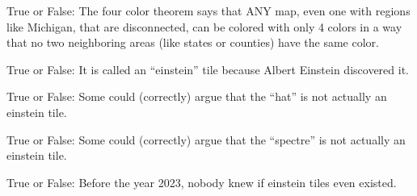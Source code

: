 \documentclass[nooutcomes,noauthor]{ximera}
\author{Bart Snapp}
\begin{document}
\maketitle


\begin{exercise}
  True or False: The four color theorem says that ANY map, even one
  with regions like Michigan, that are disconnected, can be colored
  with only 4 colors in a way that no two neighboring areas (like
  states or counties) have the same color.
\end{exercise}



\begin{exercise}
  True or False: It is called an ``einstein'' tile because Albert
  Einstein discovered it.
\end{exercise}



\begin{exercise}
  True or False: Some could (correctly) argue that the ``hat'' is not
  actually an einstein tile.
\end{exercise}



\begin{exercise}  
  True or False: Some could (correctly) argue that the ``spectre'' is
  not actually an einstein tile.
\end{exercise}


\begin{exercise}  
  True or False: Before the year 2023, nobody knew if einstein tiles even existed.
\end{exercise}



\end{document}
